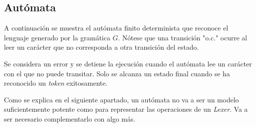 \documentclass[a4paper]{CSMakotoTechnicalReport}
\begin{document}
    \subsection{Autómata}

    A continuación se muestra el autómata finito determinista que reconoce el lenguaje generado por la gramática $G$. Nótese que una transición "o.c." ocurre al leer un carácter que no corresponda a otra transición del estado.

    Se considera un error y se detiene la ejecución cuando el autómata lee un carácter con el que no puede transitar. Solo se alcanza un estado final cuando se ha reconocido un \textit{token} exitosamente.

    Como se explica en el siguiente apartado, un autómata no va a ser un modelo suficientemente potente como para representar las operaciones de un \textit{Lexer}. Va a ser necesario complementarlo con algo más.

    \vspace{0.02\textheight}
\end{document}
